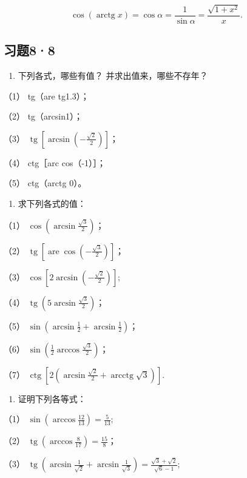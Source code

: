 \[
\cos \left(\operatorname{arctg} x\right) = \cos \alpha = \frac {1}{\sin \alpha} = \frac {\sqrt {1 + x ^ {2}}}{x}.
\]

\subsection{习题8·8}

\begin{enumerate}
\item
  下列各式，哪些有值？ 并求出值来，哪些不存年？
\end{enumerate}

（1） tg（are tg1.3）；

（2） tg（arcsin1）；

（3） \(\operatorname{tg}[\arcsin\left(-\frac{\sqrt{2}}{2}\right)]\)；

（4） ctg［arc cos（-1）］；

（5） ctg（arctg 0）。

\begin{enumerate}[start=2]
\item
  求下列各式的值：
\end{enumerate}

（1） \(\cos \left(\arcsin \frac{\sqrt{3}}{2}\right)\)；

（2）
\(\operatorname{tg}\left[\operatorname{are}\cos\left(-\frac{\sqrt{3}}{2}\right)\right]\)；

（3） \(\cos \left[2\arcsin \left(-\frac{\sqrt{2}}{2}\right)\right];\)

（4） \(\operatorname{tg}\left(5\arcsin \frac{\sqrt{3}}{2}\right)\)；

（5） \(\sin \left(\arcsin \frac{1}{2} + \arcsin \frac{1}{2}\right)\)；

（6） \(\sin \left(\frac{1}{2} \arccos \frac{\sqrt{3}}{2}\right)\)；

（7）
\(\operatorname{ctg}\left[2\left(\arcsin \frac{\sqrt{2}}{2} + \operatorname{arcctg}\sqrt{3}\right)\right]\).

\begin{enumerate}[start=3]
\item
  证明下列各等式：
\end{enumerate}

（1） \(\sin \left(\arccos \frac{12}{13}\right) = \frac{5}{13};\)

（2）
\(\operatorname{tg}\left(\arccos \frac{8}{17}\right) = \frac{15}{8}\)；

（3）
\(\operatorname{tg}\left(\arcsin \frac{1}{\sqrt{2}} + \arcsin \frac{1}{\sqrt{3}}\right) = \frac{\sqrt{3} + \sqrt{2}}{\sqrt{6} - 1};\)

